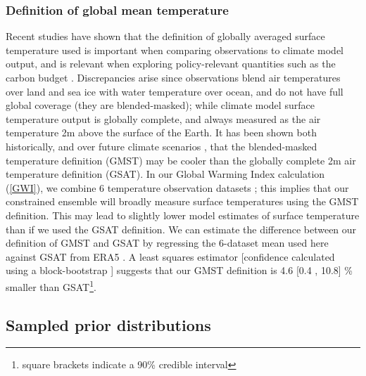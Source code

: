\documentclass[gmd, manuscript]{copernicus}
\begin{document}
\subsubsection{Definition of global mean temperature}
Recent studies \citep{Richardson2016,Richardson2018} have shown that the definition of globally averaged surface temperature used is important when comparing observations to climate model output, and is relevant when exploring policy-relevant quantities such as the carbon budget \citep{Tokarska2019}. Discrepancies arise since observations blend air temperatures over land and sea ice with water temperature over ocean, and do not have full global coverage (they are blended-masked); while climate model surface temperature output is globally complete, and always measured as the air temperature 2m above the surface of the Earth. It has been shown both historically, and over future climate scenarios \citep{Richardson2018}, that the blended-masked temperature definition (GMST) may be cooler than the globally complete 2m air temperature definition (GSAT). In our Global Warming Index calculation (\ref{GWI}), we combine 6 temperature observation datasets \citep{Lenssen2019,Cowtan2014,Vose2012,Morice2011,Rohde2013,Morice2020}; this implies that our constrained ensemble will broadly measure surface temperatures using the GMST definition. This may lead to slightly lower model estimates of surface temperature than if we used the GSAT definition. We can estimate the difference between our definition of GMST and GSAT by regressing the 6-dataset mean used here against GSAT from ERA5 \citep{Hersbach2020}. A least squares estimator [confidence calculated using a block-bootstrap \citep{Wilks1997}] suggests that our GMST definition is 4.6 [0.4 , 10.8] \% smaller than GSAT\footnote{square brackets indicate a 90\% credible interval}.
\subsection{Sampled prior distributions} \label{NROY_priors}
\end{document}

